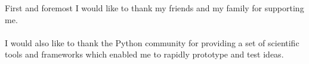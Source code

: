 First and foremost I would like to thank my friends and my family for
supporting me.
\\
\\
I would also like to thank the Python community for providing a set of
scientific tools and frameworks which enabled me to rapidly prototype
and test ideas.

